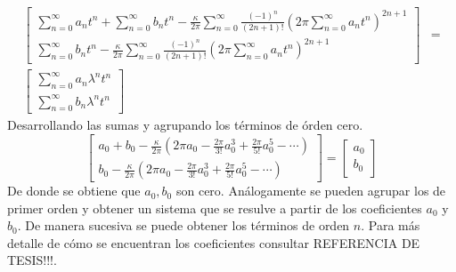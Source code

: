 \begin{align*}
	\left[
	\begin{array}{c}
		\sum_{n=0}^{\infty}a_{n}t^{n} + \sum_{n=0}^{\infty}b_{n}t^{n}-\frac{\kappa}{2\pi}\sum_{n=0}^{\infty}\frac{(-1)^{n}}{(2n+1)!}\left(2\pi \sum_{n=0}^{\infty}a_{n}t^{n}\right)^{2n+1}\\
		\sum_{n=0}^{\infty}b_{n}t^{n}-\frac{\kappa}{2\pi}\sum_{n=0}^{\infty}\frac{(-1)^{n}}{(2n+1)!}\left(2\pi\sum_{n=0}^{\infty}a_{n}t^{n}\right)^{2n+1}
	\end{array}	\right]
	&=\\
	\left[
	\begin{array}{c}
		\sum_{n=0}^{\infty}a_{n}\lambda^{n}t^{n} \\
		\sum_{n=0}^{\infty}b_{n}\lambda^{n}t^{n}
	\end{array}
	\right]
\end{align*}
Desarrollando las sumas y agrupando los t\'erminos de \'orden cero.
\begin{equation}
	\left[
	\begin{array}{c}
	
			a_{0}+b_{0}-\frac{\kappa}{2\pi}\left(2\pi a_{0}-\frac{2\pi}{3!} 	a_{0}^{3}+\frac{2\pi}{5!} a_{0}^{5}-\cdots
			\right)\\
			b_{0}-\frac{\kappa}{2\pi}\left(2\pi a_{0}-\frac{2\pi}{3!}a_{0}^{3}+\frac{2\pi}{5!}a_{0}^{5}-\cdots\right)
	\end{array}
	\right]=
	\left[
	\begin{array}{c}
		a_{0}\\
		b_{0}
	\end{array}
	\right]
\end{equation}
De donde se obtiene que $a_{0},b_{0}$ son cero. An\'alogamente se pueden agrupar los de primer orden y obtener un sistema que se resulve a partir de los coeficientes $a_{0}$ y $b_{0}$. De manera sucesiva se puede obtener los t\'erminos de orden $n$. Para m\'as detalle de c\'omo se encuentran los coeficientes consultar REFERENCIA DE TESIS!!!. 


